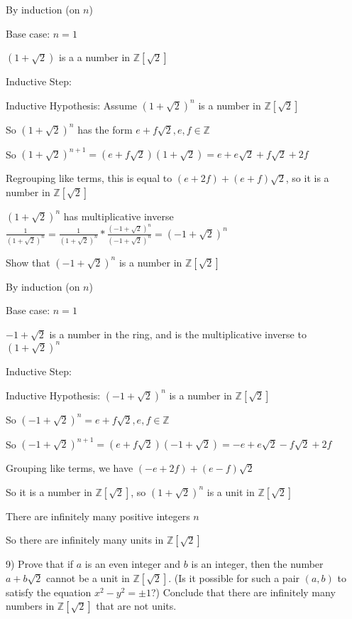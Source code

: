\documentclass[11pt]{article}
\begin{document}
\begin{itemize}
	By induction (on $n$)

	Base case: $n = 1$

	$(1 + \sqrt{2})$ is a a number in $\mathbb{Z}[\sqrt{2}]$

	Inductive Step:

	Inductive Hypothesis: Assume $(1 + \sqrt{2})^n$ is a number in $\mathbb{Z}[\sqrt{2}]$

	So $(1 + \sqrt{2})^n$ has the form $e + f\sqrt{2}, e, f \in\mathbb{Z}$

	So $(1 + \sqrt{2})^{n+1} = (e + f\sqrt{2})(1 + \sqrt{2}) = e + e\sqrt{2} + f\sqrt{2} + 2f$

	Regrouping like terms, this is equal to $(e + 2f) + (e + f)\sqrt{2}$, so it is a number in $\mathbb{Z}[\sqrt{2}]$

	$(1 + \sqrt{2})^n$ has multiplicative inverse $\frac{1}{(1 + \sqrt{2})^n} = \frac{1}{(1 + \sqrt{2})^n} * \frac{(-1 + \sqrt{2})^n}{(-1 + \sqrt{2})^n} = (-1 + \sqrt{2})^n$

	Show that $(-1 + \sqrt{2})^n$ is a number in $\mathbb{Z}[\sqrt{2}]$

	By induction (on $n$)

	Base case: $n = 1$

	$-1 + \sqrt{2}$ is a number in the ring, and is the multiplicative inverse to $(1 + \sqrt{2})^n$

	Inductive Step:

	Inductive Hypothesis: $(-1 + \sqrt{2})^n$ is a number in $\mathbb{Z}[\sqrt{2}]$

	So $(-1 + \sqrt{2})^n = e + f\sqrt{2}, e,f \in\mathbb{Z}$

	So $(-1 + \sqrt{2})^{n+1} = (e + f\sqrt{2})(-1 + \sqrt{2}) = -e + e\sqrt{2} - f\sqrt{2} + 2f$

	Grouping like terms, we have $(-e + 2f) + (e - f)\sqrt{2}$

	So it is a number in $\mathbb{Z}[\sqrt{2}]$, so $(1 + \sqrt{2})^n$ is a unit in $\mathbb{Z}[\sqrt{2}]$

	There are infinitely many positive integers $n$

	So there are infinitely many units in $\mathbb{Z}[\sqrt{2}]$

	9) Prove that if $a$ is an even integer and $b$ is an integer, then the number $a + b\sqrt{2}$ cannot be a unit in $\mathbb{Z}[\sqrt{2}]$. (Is it possible for such a pair $(a,b)$ to satisfy the equation $x^2 - y^2 = \pm 1$?) Conclude that there are infinitely many numbers in $\mathbb{Z}[\sqrt{2}]$ that are not units.


\end{itemize}
\end{document}
